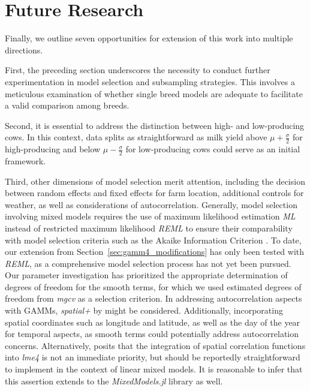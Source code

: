 \section{Future Research}
Finally, we outline seven opportunities for extension of this work into multiple directions.

\vspace*{\baselineskip}
First, the preceding section underscores the necessity to conduct further experimentation in model selection and subsampling strategies. This involves a meticulous examination of whether single breed models are adequate to facilitate a valid comparison among breeds.

\vspace*{\baselineskip}
Second, it is essential to address the distinction between high- and low-producing cows. In this context, data splits as straightforward as milk yield above $\mu + \frac{\sigma}{2}$ for high-producing and below $\mu - \frac{\sigma}{2}$ for low-producing cows could serve as an initial framework.

\vspace*{\baselineskip}
Third, other dimensions of model selection merit attention, including the decision between random effects and fixed effects for farm location, additional controls for weather, as well as considerations of autocorrelation. Generally, model selection involving mixed models requires the use of maximum likelihood estimation \textit{ML} instead of restricted maximum likelihood \textit{REML} to ensure their comparability with model selection criteria such as the Akaike Information Criterion \citep{bozdogan_model_1987}. To date, our extension from Section~\ref{sec:gamm4_modifications} has only been tested with \textit{REML}, as a comprehensive model selection process has not yet been pursued. Our parameter investigation has prioritized the appropriate determination of degrees of freedom for the smooth terms, for which we used estimated degrees of freedom from \textit{mgcv} as a selection criterion. In addressing autocorrelation aspects with GAMMs, \textit{spatial+} by \cite{dupont_spatial_2020} might be considered. Additionally, incorporating spatial coordinates such as longitude and latitude, as well as the day of the year for temporal aspects, as smooth terms could potentially address autocorrelation concerns. Alternatively, \cite{bolker_glmmFAQ} posits that the integration of spatial correlation functions into \textit{lme4} is not an immediate priority, but should be reportedly straightforward to implement in the context of linear mixed models. It is reasonable to infer that this assertion extends to the \textit{MixedModels.jl} library as well.

